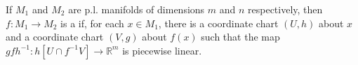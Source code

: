If $M_1$ and $M_2$ are p.l. manifolds of dimensions $m$ and $n$ respectively, then $f: M_1 \to M_2$ is a  if, for each $x \in M_1$, there is a coordinate chart $(U, h)$ about $x$ and a coordinate chart $(V, g)$ about $f(x)$ such that the map $g f h^{-1}: h[U \cap f^{-1}V] \to \mathbb{R}^m$ is piecewise linear.
